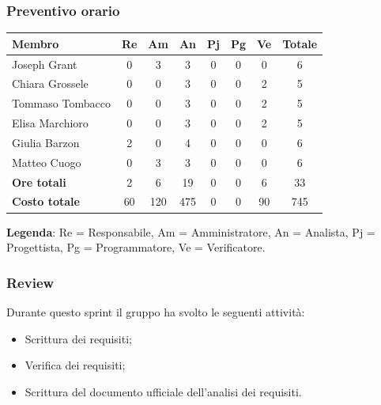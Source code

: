 \documentclass[11pt,a4paper]{article}
\begin{document}
\subsubsection{Preventivo orario}
\begin{center}
    \begin{tabular}{|l|c|c|c|c|c|c|c|}
        \hline
        \textbf{Membro} & \textbf{Re} & \textbf{Am} & \textbf{An} & \textbf{Pj} & \textbf{Pg} & \textbf{Ve} & \textbf{Totale} \\
        \hline
        Joseph Grant & 0 & 3 & 3 & 0 & 0 & 0 & 6 \\
        \hline
        Chiara Grossele & 0 & 0 & 3 & 0 & 0 & 2 & 5 \\
        \hline
        Tommaso Tombacco & 0 & 0 & 3 & 0 & 0 & 2 & 5 \\
        \hline
        Elisa Marchioro & 0 & 0 & 3 & 0 & 0 & 2 & 5 \\
        \hline
        Giulia Barzon & 2 & 0 & 4 & 0 & 0 & 0 & 6 \\
        \hline
        Matteo Cuogo & 0 & 3 & 3 & 0 & 0 & 0 & 6 \\
        \hline
        \textbf{Ore totali} & 2 & 6 & 19 & 0 & 0 & 6 & 33 \\
        \hline
        \textbf{Costo totale} & 60 & 120 & 475 & 0 & 0 & 90 & 745 \\
        \hline
    \end{tabular}
\end{center}

\noindent \textbf{Legenda}: Re = Responsabile, Am = Amministratore, An = Analista, Pj = Progettista, Pg = Programmatore, Ve = Verificatore.

\subsubsection{Review}
Durante questo sprint il gruppo ha svolto le seguenti attività:

\begin{itemize}
        \item Scrittura dei requisiti;
        \item Verifica dei requisiti;
        \item Scrittura del documento ufficiale dell'analisi dei requisiti.
    \end{itemize}
\end{document}
